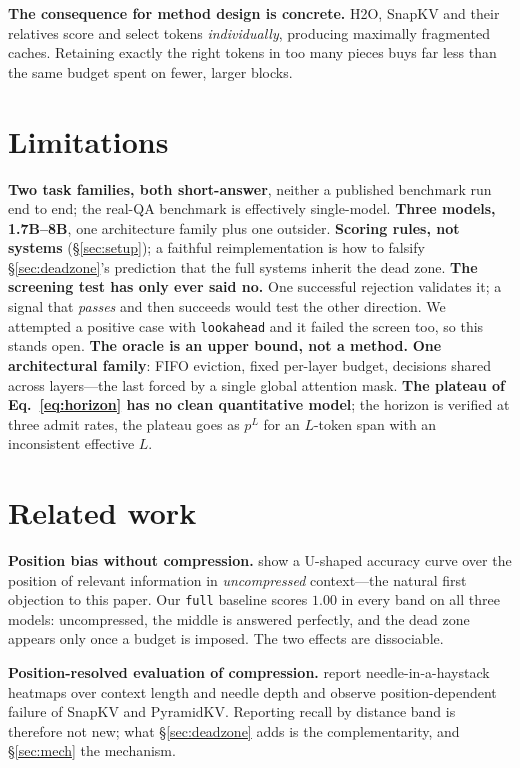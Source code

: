 \documentclass[10pt]{article}
\begin{document}
\textbf{The consequence for method design is concrete.} H2O, SnapKV and their
relatives score and select tokens \emph{individually}, producing maximally
fragmented caches. Retaining exactly the right tokens in too many pieces buys
far less than the same budget spent on fewer, larger blocks.

\section{Limitations}\label{sec:limits}

\textbf{Two task families, both short-answer}, neither a published benchmark
run end to end; the real-QA benchmark is effectively single-model.
\textbf{Three models, 1.7B--8B}, one architecture family plus one outsider.
\textbf{Scoring rules, not systems} (\S\ref{sec:setup}); a faithful
reimplementation is how to falsify \S\ref{sec:deadzone}'s prediction that the
full systems inherit the dead zone.
\textbf{The screening test has only ever said no.} One successful rejection
validates it; a signal that \emph{passes} and then succeeds would test the
other direction. We attempted a positive case with \texttt{lookahead} and it
failed the screen too, so this stands open.
\textbf{The oracle is an upper bound, not a method.}
\textbf{One architectural family}: FIFO eviction, fixed per-layer budget,
decisions shared across layers---the last forced by a single global attention
mask.
\textbf{The plateau of Eq.~\ref{eq:horizon} has no clean quantitative model};
the horizon is verified at three admit rates, the plateau goes as $p^L$ for an
$L$-token span with an inconsistent effective $L$.

\section{Related work}\label{sec:related}

\textbf{Position bias without compression.} \citet{liu2024lost} show a U-shaped
accuracy curve over the position of relevant information in \emph{uncompressed}
context---the natural first objection to this paper. Our \texttt{full} baseline
scores $1.00$ in every band on all three models: uncompressed, the middle is
answered perfectly, and the dead zone appears only once a budget is imposed.
The two effects are dissociable.

\textbf{Position-resolved evaluation of compression.} \citet{indexmem2026}
report needle-in-a-haystack heatmaps over context length and needle depth and
observe position-dependent failure of SnapKV and PyramidKV. Reporting recall by
distance band is therefore not new; what \S\ref{sec:deadzone} adds is the
complementarity, and \S\ref{sec:mech} the mechanism.
\end{document}
